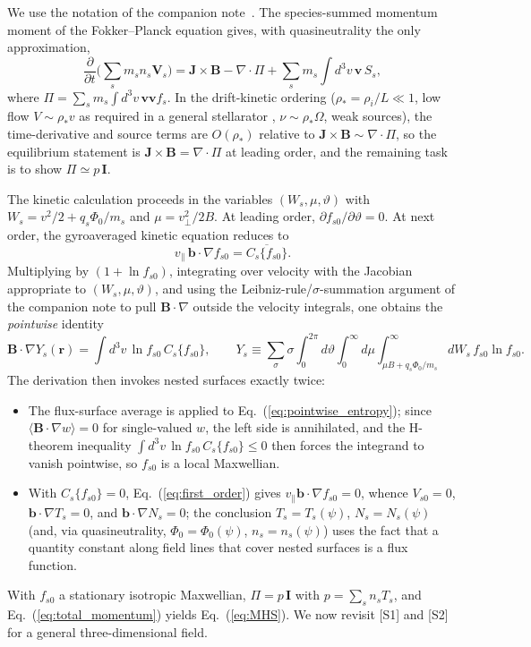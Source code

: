 \documentclass[english]{article}
\newcommand{\bB}{\mathbf{B}}
\newcommand{\bJ}{\mathbf{J}}
\newcommand{\bb}{\mathbf{b}}
\newcommand{\bv}{\mathbf{v}}
\newcommand{\br}{\mathbf{r}}
\newcommand{\bV}{\mathbf{V}}
\newcommand{\bI}{\mathbf{I}}
\begin{document}
We use the notation of the companion note~\cite{landreman_note}. The species-summed momentum moment
of the Fokker--Planck equation gives, with quasineutrality the only approximation,
\begin{equation}
\frac{\partial}{\partial t}\Big(\sum_s m_s n_s\bV_s\Big)
=\bJ\times\bB-\nabla\cdot\Pi+\sum_s m_s\!\int d^3v\,\bv\,S_s ,
\label{eq:total_momentum}
\end{equation}
where $\Pi=\sum_s m_s\int d^3v\,\bv\bv f_s$. In the drift-kinetic ordering
($\rho_*=\rho_i/L\ll1$, low flow $V\sim\rho_* v$ as required in a general stellarator
\cite{helander2007}, $\nu\sim\rho_*\Omega$, weak sources), the time-derivative and source terms are
$O(\rho_*)$ relative to $\bJ\times\bB\sim\nabla\cdot\Pi$, so the equilibrium statement is
$\bJ\times\bB=\nabla\cdot\Pi$ at leading order, and the remaining task is to show
$\Pi\simeq p\,\bI$.

The kinetic calculation proceeds in the variables $(W_s,\mu,\vartheta)$ with
$W_s=v^2/2+q_s\Phi_0/m_s$ and $\mu=v_\perp^2/2B$. At leading order,
$\partial f_{s0}/\partial\vartheta=0$. At next order, the gyroaveraged kinetic equation reduces to
\begin{equation}
v_\parallel\,\bb\cdot\nabla f_{s0}=\overline{C_s\{f_{s0}\}} .
\label{eq:first_order}
\end{equation}
Multiplying by $(1+\ln f_{s0})$, integrating over velocity with the Jacobian appropriate to
$(W_s,\mu,\vartheta)$, and using the Leibniz-rule/$\sigma$-summation argument of the companion note
to pull $\bB\cdot\nabla$ outside the velocity integrals, one obtains the \emph{pointwise} identity
\begin{equation}
\bB\cdot\nabla Y_s(\br)=\int d^3v\,\ln f_{s0}\,C_s\{f_{s0}\},
\qquad
Y_s\equiv\sum_\sigma\sigma\int_0^{2\pi}\!\!d\vartheta\int_0^\infty\!\!d\mu
\int_{\mu B+q_s\Phi_0/m_s}^{\infty}\!\!dW_s\,f_{s0}\ln f_{s0}.
\label{eq:pointwise_entropy}
\end{equation}
The derivation then invokes nested surfaces exactly twice:
\begin{itemize}
\item[{[S1]}] The flux-surface average is applied to Eq.~(\ref{eq:pointwise_entropy}); since
$\langle\bB\cdot\nabla w\rangle=0$ for single-valued $w$, the left side is annihilated, and the
H-theorem inequality $\int d^3v\,\ln f_{s0}\,C_s\{f_{s0}\}\le0$ then forces the integrand to vanish
pointwise, so $f_{s0}$ is a local Maxwellian.
\item[{[S2]}] With $C_s\{f_{s0}\}=0$, Eq.~(\ref{eq:first_order}) gives
$v_\parallel\bb\cdot\nabla f_{s0}=0$, whence $V_{s0}=0$, $\bb\cdot\nabla T_s=0$, and
$\bb\cdot\nabla N_s=0$; the conclusion $T_s=T_s(\psi)$, $N_s=N_s(\psi)$ (and, via quasineutrality,
$\Phi_0=\Phi_0(\psi)$, $n_s=n_s(\psi)$) uses the fact that a quantity constant along field lines
that cover nested surfaces is a flux function.
\end{itemize}
With $f_{s0}$ a stationary isotropic Maxwellian, $\Pi=p\,\bI$ with $p=\sum_s n_sT_s$, and
Eq.~(\ref{eq:total_momentum}) yields Eq.~(\ref{eq:MHS}). We now revisit [S1] and [S2] for a general
three-dimensional field.
\end{document}
